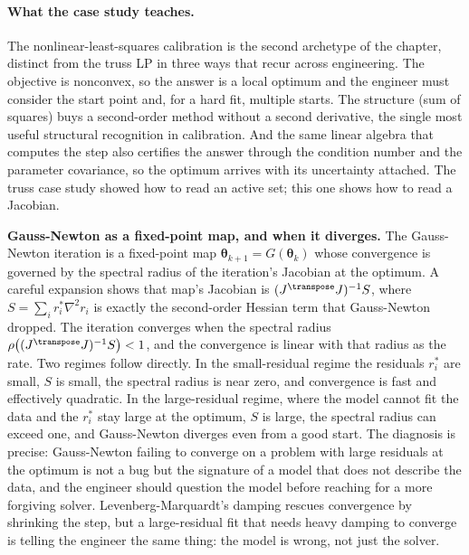 \paragraph{What the case study teaches.}
The nonlinear-least-squares calibration is the second archetype of the
chapter, distinct from the truss LP in three ways that recur across
engineering. The objective is nonconvex, so the answer is a local
optimum and the engineer must consider the start point and, for a hard
fit, multiple starts. The structure (sum of squares) buys a
second-order method without a second derivative, the single most
useful structural recognition in calibration. And the same linear
algebra that computes the step also certifies the answer through the
condition number and the parameter covariance, so the optimum arrives
with its uncertainty attached. The truss case study showed how to read
an active set; this one shows how to read a Jacobian.

\begin{mastery}
\textbf{Gauss-Newton as a fixed-point map, and when it diverges.} The
Gauss-Newton iteration is a fixed-point map $\boldsymbol{\theta}_{k+1}
= G(\boldsymbol{\theta}_{k})$ whose convergence is governed by the
spectral radius of the iteration's Jacobian at the optimum. A careful
expansion shows that map's Jacobian is $(J^{\transpose} J)^{-1} S$,
where $S = \sum_{i} r_{i}^{*} \nabla^{2} r_{i}$ is exactly the
second-order Hessian term that Gauss-Newton dropped. The iteration
converges when the spectral radius $\rho\big((J^{\transpose} J)^{-1}
S\big) < 1$, and the convergence is linear with that radius as the
rate. Two regimes follow directly. In the small-residual regime the
residuals $r_{i}^{*}$ are small, $S$ is small, the spectral radius is
near zero, and convergence is fast and effectively quadratic. In the
large-residual regime, where the model cannot fit the data and the
$r_{i}^{*}$ stay large at the optimum, $S$ is large, the spectral
radius can exceed one, and Gauss-Newton diverges even from a good
start. The diagnosis is precise: Gauss-Newton failing to converge on a
problem with large residuals at the optimum is not a bug but the
signature of a model that does not describe the data, and the engineer
should question the model before reaching for a more forgiving solver.
Levenberg-Marquardt's damping rescues convergence by shrinking the
step, but a large-residual fit that needs heavy damping to converge is
telling the engineer the same thing: the model is wrong, not just the
solver.
\end{mastery}

